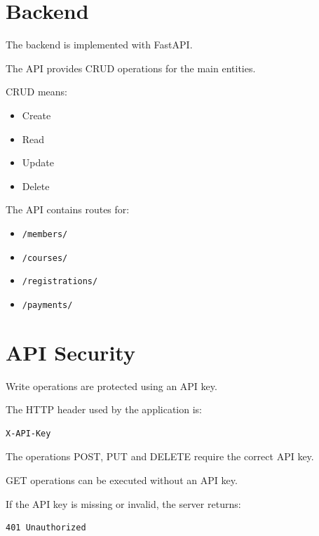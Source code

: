 \documentclass[12pt,a4paper]{article}
\begin{document}

\section{Backend}

The backend is implemented with FastAPI.

The API provides CRUD operations for the main entities.

CRUD means:

\begin{itemize}
    \item Create
    \item Read
    \item Update
    \item Delete
\end{itemize}

The API contains routes for:

\begin{itemize}
    \item \texttt{/members/}
    \item \texttt{/courses/}
    \item \texttt{/registrations/}
    \item \texttt{/payments/}
\end{itemize}



\section{API Security}

Write operations are protected using an API key.

The HTTP header used by the application is:

\begin{lstlisting}
X-API-Key
\end{lstlisting}

The operations POST, PUT and DELETE require the correct API key.

GET operations can be executed without an API key.

If the API key is missing or invalid, the server returns:

\begin{lstlisting}
401 Unauthorized
\end{lstlisting}
\end{document}
